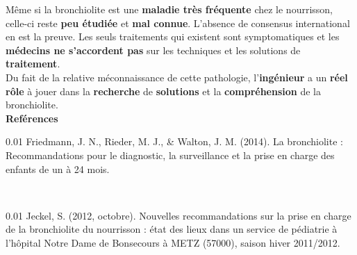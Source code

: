 \documentclass[a0paper,portrait]{baposter}
\begin{document}
\begin{poster}
{\RaggedRight
Même si la bronchiolite est une \textbf{maladie très fréquente} chez le nourrisson, \mbox{celle-ci} reste \textbf{peu étudiée} et \textbf{mal connue}. L’absence de consensus international en est la preuve.
Les seuls traitements qui existent sont symptomatiques et les \textbf{médecins ne s’accordent pas} sur les techniques et les solutions de \textbf{traitement}.\\
Du fait de la relative méconnaissance de cette pathologie, l’\textbf{ingénieur} a un \textbf{réel rôle} à jouer dans la \textbf{recherche} de \textbf{solutions} et la \textbf{compréhension} de la bronchiolite.\\
\vspace{0.05cm}
{\footnotesize \textbf{Reférences}}\\
\vspace{0.1cm}
\begin{spacing}{0.01}
{\tiny Friedmann, J. N., Rieder, M. J., & Walton, J. M. (2014). La bronchiolite : Recommandations pour le diagnostic, la surveillance et la prise en charge des enfants de un à 24 mois.}
\end{spacing}\\
\vspace{0.05cm}
\begin{spacing}{0.01}
{\tiny Jeckel, S. (2012, octobre). Nouvelles recommandations sur la prise en charge de la bronchiolite du nourrisson : état des lieux dans un service de pédiatrie à l’hôpital Notre Dame de Bonsecours à METZ (57000), saison hiver 2011/2012.}
\end{spacing}
}

\end{poster}
\end{document}

